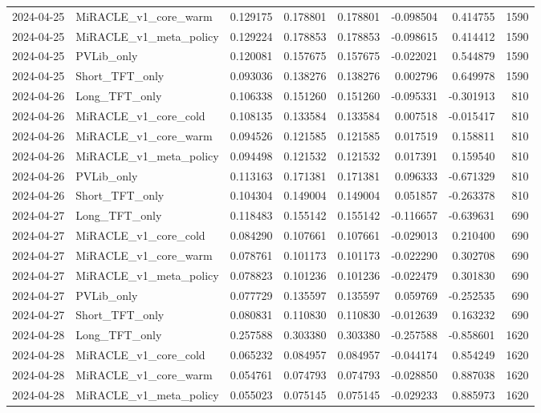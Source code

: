 \begin{tabular}{llrrrrrr}
2024-04-25 & MiRACLE_v1_core_warm & 0.129175 & 0.178801 & 0.178801 & -0.098504 & 0.414755 & 1590 \\
2024-04-25 & MiRACLE_v1_meta_policy & 0.129224 & 0.178853 & 0.178853 & -0.098615 & 0.414412 & 1590 \\
2024-04-25 & PVLib_only & 0.120081 & 0.157675 & 0.157675 & -0.022021 & 0.544879 & 1590 \\
2024-04-25 & Short_TFT_only & 0.093036 & 0.138276 & 0.138276 & 0.002796 & 0.649978 & 1590 \\
2024-04-26 & Long_TFT_only & 0.106338 & 0.151260 & 0.151260 & -0.095331 & -0.301913 & 810 \\
2024-04-26 & MiRACLE_v1_core_cold & 0.108135 & 0.133584 & 0.133584 & 0.007518 & -0.015417 & 810 \\
2024-04-26 & MiRACLE_v1_core_warm & 0.094526 & 0.121585 & 0.121585 & 0.017519 & 0.158811 & 810 \\
2024-04-26 & MiRACLE_v1_meta_policy & 0.094498 & 0.121532 & 0.121532 & 0.017391 & 0.159540 & 810 \\
2024-04-26 & PVLib_only & 0.113163 & 0.171381 & 0.171381 & 0.096333 & -0.671329 & 810 \\
2024-04-26 & Short_TFT_only & 0.104304 & 0.149004 & 0.149004 & 0.051857 & -0.263378 & 810 \\
2024-04-27 & Long_TFT_only & 0.118483 & 0.155142 & 0.155142 & -0.116657 & -0.639631 & 690 \\
2024-04-27 & MiRACLE_v1_core_cold & 0.084290 & 0.107661 & 0.107661 & -0.029013 & 0.210400 & 690 \\
2024-04-27 & MiRACLE_v1_core_warm & 0.078761 & 0.101173 & 0.101173 & -0.022290 & 0.302708 & 690 \\
2024-04-27 & MiRACLE_v1_meta_policy & 0.078823 & 0.101236 & 0.101236 & -0.022479 & 0.301830 & 690 \\
2024-04-27 & PVLib_only & 0.077729 & 0.135597 & 0.135597 & 0.059769 & -0.252535 & 690 \\
2024-04-27 & Short_TFT_only & 0.080831 & 0.110830 & 0.110830 & -0.012639 & 0.163232 & 690 \\
2024-04-28 & Long_TFT_only & 0.257588 & 0.303380 & 0.303380 & -0.257588 & -0.858601 & 1620 \\
2024-04-28 & MiRACLE_v1_core_cold & 0.065232 & 0.084957 & 0.084957 & -0.044174 & 0.854249 & 1620 \\
2024-04-28 & MiRACLE_v1_core_warm & 0.054761 & 0.074793 & 0.074793 & -0.028850 & 0.887038 & 1620 \\
2024-04-28 & MiRACLE_v1_meta_policy & 0.055023 & 0.075145 & 0.075145 & -0.029233 & 0.885973 & 1620 \\

\end{tabular}
